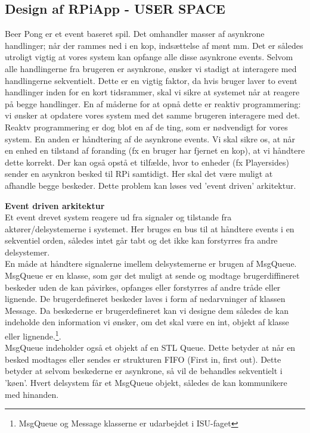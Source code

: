 \documentclass[Softwaredesign/Softwaredesign_main.tex]{subfiles}
\begin{document}
\subsection{Design af RPiApp - USER SPACE}
Beer Pong er et event baseret spil. Det omhandler masser af asynkrone handlinger; når der rammes ned i en kop, indsættelse af mønt mm. Det er således utroligt vigtig at vores system kan opfange alle disse asynkrone events. Selvom alle handlingerne fra brugeren er asynkrone, ønsker vi stadigt at interagere med handlingerne sekventielt. Dette er en vigtig faktor, da hvis bruger laver to event handlinger inden for en kort tidsrammer, skal vi sikre at systemet når at reagere på begge handlinger. En af måderne for at opnå dette er reaktiv programmering: vi ønsker at opdatere vores system med det samme brugeren interagere med det. 
\\Reaktv programmering er dog blot en af de ting, som er nødvendigt for vores system. En anden er håndtering af de asynkrone events. Vi skal sikre os, at når en enhed en tilstand af foranding (fx en bruger har fjernet en kop), at vi håndtere dette korrekt. Der kan også opstå et tilfælde, hvor to enheder (fx Playersides) sender en asynkron besked til RPi samtidigt. Her skal det være muligt at afhandle begge beskeder. Dette problem kan løses ved 'event driven' arkitektur. 

\textbf{Event driven arkitektur}
\\Et event drevet system reagere ud fra signaler og tilstande fra aktører/delsystemerne i systemet. Her bruges en bus til at håndtere events i en sekventiel orden, således intet går tabt og det ikke kan forstyrres fra andre delsystemer. 
\\En måde at håndtere signalerne imellem delsystemerne er brugen af MsgQueue. MsgQueue er en klasse, som gør det muligt at sende og modtage brugerdiffineret beskeder uden de kan påvirkes, opfanges eller forstyrres af andre tråde eller lignende. De brugerdefineret beskeder laves i form af nedarvninger af klassen Message. Da beskederne er brugerdefineret kan vi designe dem således de kan indeholde den information vi ønsker, om det skal være en int, objekt af klasse eller lignende.\footnote{MsgQueue og Message klasserne er udarbejdet i ISU-faget}. 
\\MsgQueue indeholder også et objekt af en STL Queue. Dette betyder at når en besked modtages eller sendes er strukturen FIFO (First in, first out). Dette betyder at selvom beskederne er asynkrone, så vil de behandles sekventielt i 'køen'. Hvert delsystem får et MsgQueue objekt, således de kan kommunikere med hinanden. 
\end{document}
